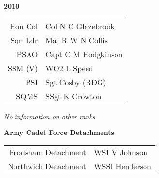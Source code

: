 \begin{center}
  \Huge
  \textbf{2010}
\end{center}

\begin{center}
  \small
  \begin{tabular}{rl}
    Hon Col & Col N C Glazebrook \\
    Sqn Ldr & Maj R W N Collis \\
    PSAO & Capt C M Hodgkinson \\
    SSM (V) & WO2 L Speed \\
    PSI & Sgt Cosby (RDG) \\
    SQMS & SSgt K Crowton \\
  \end{tabular}
\end{center}

\begin{center}
  \textit{No information on other ranks}
\end{center}

\begin{center}
  \large
  \textbf{Army Cadet Force Detachments}
\end{center}

\begin{center}
  \small
  \begin{tabular}{rl}
    Frodsham Detachment & WSI V Johnson \\
    Northwich Detachment & WSSI Henderson \\
  \end{tabular}
\end{center}

\vspace{80mm}

\pagebreak
